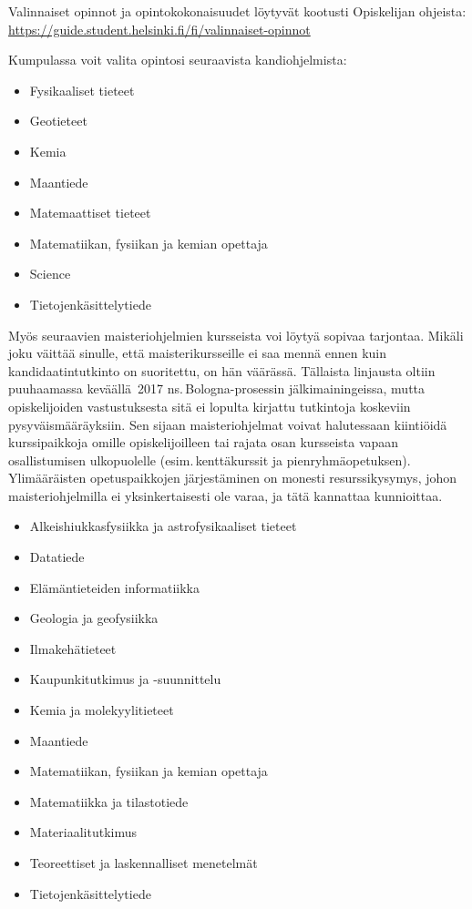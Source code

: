 \documentclass[a5paper, 8pt, twocolumn]{book} %
\numberwithin{equation}{section}
\begin{document}
Valinnaiset opinnot ja opintokokonaisuudet löytyvät kootusti Opiskelijan ohjeista: \url{https://guide.student.helsinki.fi/fi/valinnaiset-opinnot}

Kumpulassa voit valita opintosi seuraavista
kandiohjelmista:
\begin{itemize}
	\item Fysikaaliset tieteet
	\item Geotieteet
	\item Kemia
	\item Maantiede
	\item Matemaattiset tieteet
	\item Matematiikan, fysiikan ja kemian opettaja
	\item Science
	\item Tietojenkäsittelytiede
\end{itemize}

Myös seuraavien maisteriohjelmien kursseista voi löytyä sopivaa tarjontaa. Mikäli joku väittää sinulle, että maisterikursseille ei saa mennä ennen kuin kandidaatintutkinto on suoritettu, on hän väärässä. Tällaista linjausta oltiin puuhaamassa keväällä~2017 ns.\,Bologna-prosessin jälkimainingeissa, mutta opiskelijoiden vastustuksesta sitä ei lopulta kirjattu tutkintoja koskeviin pysyväismääräyksiin. Sen sijaan maisteriohjelmat voivat halutessaan kiintiöidä kurssipaikkoja omille opiskelijoilleen tai rajata osan kursseista vapaan osallistumisen ulkopuolelle (esim.\,kenttäkurssit ja pienryhmäopetuksen). Ylimääräisten opetuspaikkojen järjestäminen on monesti resurssikysymys, johon maisteriohjelmilla ei yksinkertaisesti ole varaa, ja tätä kannattaa kunnioittaa.

\begin{itemize}
	\item Alkeishiukkasfysiikka ja astrofysikaaliset tieteet
	\item Datatiede
	\item Elämäntieteiden informatiikka
	\item Geologia ja geofysiikka
	\item Ilmakehätieteet
	\item Kaupunkitutkimus ja -suunnittelu
	\item Kemia ja molekyylitieteet
	\item Maantiede
	\item Matematiikan, fysiikan ja kemian opettaja
	\item Matematiikka ja tilastotiede
	\item Materiaalitutkimus
	\item Teoreettiset ja laskennalliset menetelmät
	\item Tietojenkäsittelytiede
\end{itemize}
\end{document}
